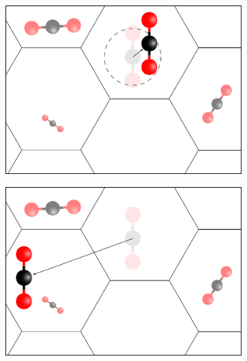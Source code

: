 \documentclass[main.tex]{subfiles}
\begin{document}
\begin{figure}
	\centering
	\begin{subfigure}{0.49\linewidth}
		\centering
		\includegraphics[width=\linewidth]{figures/cations/MC_translation.pdf}
	\end{subfigure}\hfill%
	\begin{subfigure}{0.49\linewidth}
		\centering
		\includegraphics[width=\linewidth]{figures/cations/MC_random_translation.pdf}
	\end{subfigure}

\vspace{2em}


\end{figure}
\end{document}

